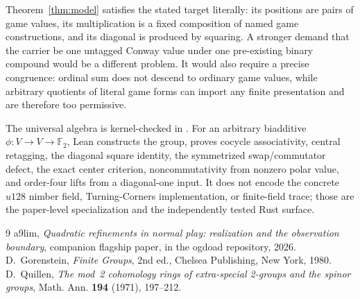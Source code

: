 \documentclass[11pt]{article}
\theoremstyle{definition}
\theoremstyle{remark}
\newcommand{\F}{\mathbb{F}}
\begin{document}
Theorem~\ref{thm:model} satisfies the stated target literally: its
positions are pairs of game values, its multiplication is a fixed
composition of named game constructions, and its diagonal is produced by
squaring.  A stronger demand that the carrier be one untagged Conway value
under one pre-existing binary compound would be a different problem.  It
would also require a precise congruence: ordinal sum does not descend to
ordinary game values, while arbitrary quotients of literal game forms can
import any finite presentation and are therefore too permissive.

The universal algebra is kernel-checked in
.  For an arbitrary biadditive
$\phi:V\to V\to\F_2$, Lean constructs the group, proves cocycle
associativity, central retagging, the diagonal square identity, the
symmetrized swap/commutator defect, the exact center criterion,
noncommutativity from nonzero polar value, and order-four lifts from a
diagonal-one input.  It does not encode the concrete $u128$ nimber field,
Turning-Corners implementation, or finite-field trace; those are the
paper-level specialization and the independently tested Rust surface.

\begin{thebibliography}{9}\footnotesize
{} a9lim, \emph{Quadratic refinements in normal play:
realization and the observation boundary}, companion flagship paper,
 in the ogdoad repository, 2026.
 D.~Gorenstein, \emph{Finite Groups}, 2nd ed.,
Chelsea Publishing, New York, 1980.
 D.~Quillen, \emph{The mod~2 cohomology rings of
extra-special 2-groups and the spinor groups}, Math. Ann. \textbf{194}
(1971), 197--212.
\end{thebibliography}
\end{document}
